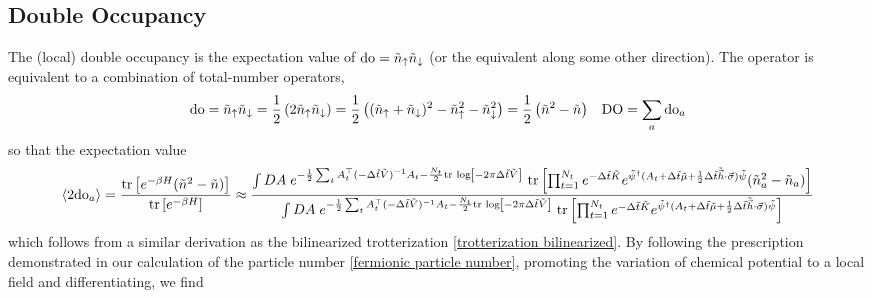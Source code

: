 \subsection{Double Occupancy}\label{sec:double occupancy}

The (local) double occupancy is the expectation value of $\textrm{do}=\tilde{n}_{\uparrow} \tilde{n}_{\downarrow}$ (or the equivalent along some other direction).
The \doubleOccupancy operator is equivalent to a combination of total-number operators,
\begin{align}
    \textrm{do}
    &= \tilde{n}_{\uparrow} \tilde{n}_{\downarrow}
    = \frac{1}{2} \left(2 \tilde{n}_{\uparrow} \tilde{n}_{\downarrow} \right)
    = \frac{1}{2} \left( (\tilde{n}_{\uparrow} + \tilde{n}_{\downarrow})^2 - \tilde{n}_{\uparrow}^2 - \tilde{n}_{\downarrow}^2\right)
    = \frac{1}{2} \left( \tilde{n}^2 - \tilde{n} \right)
    &
    \textrm{DO} = \sum_a \textrm{do}_a
\end{align}
so that the expectation value
\begin{align}
    \left\langle 2\textrm{do}_a \right\rangle
    =
    \frac{\text{tr}\left[e^{-\beta H}(\tilde{n}^2 - \tilde{n})\right]}{\text{tr}\left[e^{-\beta H}\right]}
    \approx
    \frac{ \int DA\; e^{-\frac{1}{2} \sum_t A{}^{\top}_t (-\Delta\tilde{t} \tilde{V})^{-1} A_t - \frac{N_t}{2} \text{tr log}\left[ -2\pi \Delta\tilde{t}\tilde{V}\right]}
    ~\text{tr}\left[\prod_{t=1}^{N_t} e^{-\Delta \tilde{t}\tilde{K}}  e^{ \tilde{\psi}{}^{\dagger} (A_t + \Delta\tilde{t} \tilde{\mu} + \frac{1}{2} \Delta\tilde{t} \tilde{\vec{h}}\cdot\vec{\sigma})\tilde{\psi}} (\tilde{n}^2_a - \tilde{n}_a)\right] 
    }{
    \int DA\; e^{-\frac{1}{2} \sum_t A{}^{\top}_t (-\Delta\tilde{t} \tilde{V})^{-1} A_t - \frac{N_t}{2} \text{tr log}\left[ -2\pi \Delta\tilde{t}\tilde{V}\right]}
    ~\text{tr}\left[\prod_{t=1}^{N_t} e^{-\Delta \tilde{t}\tilde{K}}  e^{ \tilde{\psi}{}^{\dagger} (A_t + \Delta\tilde{t} \tilde{\mu} + \frac{1}{2} \Delta\tilde{t} \tilde{\vec{h}}\cdot\vec{\sigma})\tilde{\psi}}\right] 
    }
\end{align}
which follows from a similar derivation as the bilinearized trotterization \eqref{trotterization bilinearized}.
By following the prescription demonstrated in our calculation of the particle number \eqref{fermionic particle number}, promoting the variation of chemical potential to a local field and differentiating, we find
